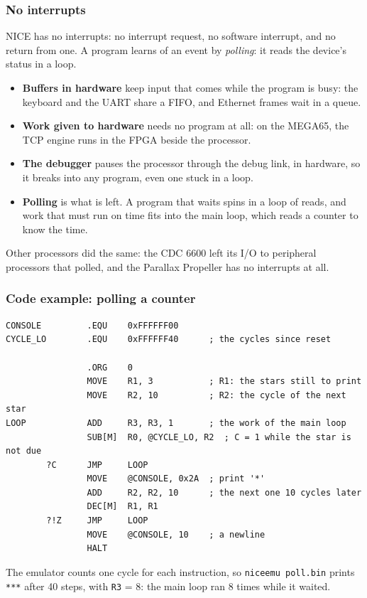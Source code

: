 \documentclass{beamer}
\newcommand{\code}[1]{\texttt{#1}}
\begin{document}
  \begin{frame}
   \frametitle{No interrupts}
   NICE has no interrupts: no interrupt request, no software interrupt,
   and no return from one. A program learns of an event by
   \emph{polling}: it reads the device's status in a loop.
   \begin{itemize}
    \item \textbf{Buffers in hardware} keep input that comes while the
     program is busy: the keyboard and the UART share a FIFO, and
     Ethernet frames wait in a queue.
    \item \textbf{Work given to hardware} needs no program at all: on the
     MEGA65, the TCP engine runs in the FPGA beside the processor.
    \item \textbf{The debugger} pauses the processor through the debug
     link, in hardware, so it breaks into any program, even one stuck in
     a loop.
    \item \textbf{Polling} is what is left. A program that waits spins in
     a loop of reads, and work that must run on time fits into the main
     loop, which reads a counter to know the time.
   \end{itemize}
   Other processors did the same: the CDC 6600 left its I/O to
   peripheral processors that polled, and the Parallax Propeller has no
   interrupts at all.
  \end{frame}
%
  \begin{frame}[fragile]
   \frametitle{Code example: polling a counter}
   {\fontsize{7}{8}\selectfont
   \begin{verbatim}
CONSOLE         .EQU    0xFFFFFF00
CYCLE_LO        .EQU    0xFFFFFF40      ; the cycles since reset

                .ORG    0
                MOVE    R1, 3           ; R1: the stars still to print
                MOVE    R2, 10          ; R2: the cycle of the next star
LOOP            ADD     R3, R3, 1       ; the work of the main loop
                SUB[M]  R0, @CYCLE_LO, R2  ; C = 1 while the star is not due
        ?C      JMP     LOOP
                MOVE    @CONSOLE, 0x2A  ; print '*'
                ADD     R2, R2, 10      ; the next one 10 cycles later
                DEC[M]  R1, R1
        ?!Z     JMP     LOOP
                MOVE    @CONSOLE, 10    ; a newline
                HALT
   \end{verbatim}
   }
   The emulator counts one cycle for each instruction, so
   \code{niceemu poll.bin} prints \code{***} after 40 steps, with
   \code{R3} = 8: the main loop ran 8 times while it waited.
  \end{frame}
\end{document}
